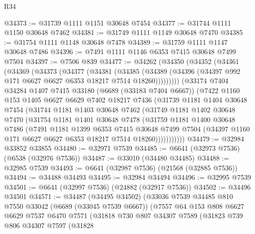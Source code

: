 \begin{lexlean}{R34}
\begin{coremodule}
@34373 := @31739 @1111 @1151 @30648 @7454
@34377 := @31744 @1111 @1150 @30648 @7462
@34381 := @31749 @1111 @1149 @30648 @7470
@34385 := @31754 @1111 @1148 @30648 @7478
@34389 := @31759 @1111 @1147 @30648 @7486
@34396 := @7491 @1111 @1146 @6353 @7415 @30648 @7499 @7504
@34397 := @7506 @839
@34477 := @34262
    (@34350
      (@34352
        (@34361
          (@34369
            (@34373
              (@34377
                (@34381
                  (@34385
                    (@34389 (@34396 (@34397 @992 @171 @6627 @6627 @6353 @18217 @7514 @18260)))))))))
        (@33174
          @7404
          @34284
          @1407
          @7415
          @33180
          (@6689 (@33183 @7404 @6667))
          (@7422
            @1160
            @153
            @1405
            @6627
            @6629
            @7402
            @18217
            @7436
            (@31739
              @1181
              @1404
              @30648
              @7454
              (@31744
                @1181
                @1403
                @30648
                @7462
                (@31749
                  @1181
                  @1402
                  @30648
                  @7470
                  (@31754
                    @1181
                    @1401
                    @30648
                    @7478
                    (@31759
                      @1181
                      @1400
                      @30648
                      @7486
                      (@7491
                        @1181
                        @1399
                        @6353
                        @7415
                        @30648
                        @7499
                        @7504
                        (@34397 @1160 @171 @6627 @6627 @6353 @18217 @7514 @18260)))))))))))
@34479 := @32984 @33852 @33855
@34480 := @32971 @7539
@34485 := @6641 (@32973 @7536) (@6538 (@32976 @7536))
@34487 := @33010 (@34480 @34485)
@34488 := @32985 @7539
@34493 := @6641 (@32987 @7536) (@21568 (@32885 @7536))
@34494 := @34488 @34493
@34495 := @32984 @34494
@34496 := @32995 @7539
@34501 := @6641 (@32997 @7536) (@24882 (@32917 @7536))
@34502 := @34496 @34501
@34571 := @34487
    (@34495 @34502)
    (@33036
      @7539
      @34485
      @810
      @7550
      @33042
      (@6689 (@33045 @7539 @6667))
      (@7557
        @64
        @153
        @808
        @6627
        @6629
        @7537
        @6470
        @7571
        (@31818
          @730
          @807
          @34307
          @7589
          (@31823
            @739
            @806
            @34307
            @7597
            (@31828

\end{coremodule}
\end{lexlean}
